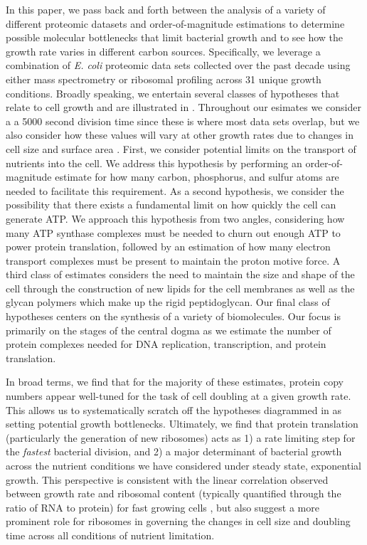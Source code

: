 In this paper, we pass back and forth between the analysis of a variety of
different proteomic datasets and order-of-magnitude estimations to determine
possible molecular bottlenecks that limit bacterial growth and to see how the
growth rate varies in different carbon sources. Specifically, we leverage a
combination of \textit{E. coli} proteomic data sets collected over the past
decade using either mass spectrometry \citep{schmidt2016,peebo2015,
valgepea2013} or ribosomal profiling \citep{li2014} across 31 unique growth
conditions. Broadly speaking, we entertain several classes of hypotheses that
relate to cell growth and are illustrated in .  Throughout our
esimates we consider a a 5000 second division time since these is where most
data sets overlap, but we also consider how these values will vary at other
growth rates due to changes in cell size and surface area
\citep{taheriaraghi2015}. First, we consider potential limits on the transport
of nutrients into the cell. We address this hypothesis by performing an
order-of-magnitude estimate for how many carbon, phosphorus, and sulfur atoms
are needed to facilitate this requirement. As a second hypothesis, we consider
the possibility that there exists a fundamental limit on how quickly the cell
can generate ATP. We approach this hypothesis from two angles, considering how
many ATP synthase complexes must be needed to churn out enough ATP to power
protein translation, followed by an estimation of how many electron transport
complexes must be present to maintain the proton motive force. A third class of
estimates considers the need to maintain the size and shape of the cell through
the construction of new lipids for the cell membranes as well as the glycan
polymers which make up the rigid peptidoglycan. Our final class of hypotheses
centers on the synthesis of a variety of biomolecules. Our focus is primarily on
the stages of the central dogma as we estimate the number of protein complexes
needed for DNA replication, transcription, and protein translation.

In broad terms, we find that for the majority of these estimates, protein copy numbers
appear well-tuned for the task of cell doubling at a given growth rate. This allows us to
systematically scratch off the hypotheses diagrammed in  as
setting potential growth bottlenecks. Ultimately, we find that protein
translation (particularly the generation of new ribosomes) acts as 1) a rate
limiting step for the \textit{fastest} bacterial division, and 2) a major
determinant of bacterial growth across the nutrient conditions we have
considered under steady state, exponential growth. This perspective is
consistent with the linear correlation observed between growth rate and
ribosomal content (typically quantified through the ratio of RNA to protein) for
fast growing cells \citep{bremer2008, scott2010}, but also suggest a more prominent role for
ribosomes in governing the changes in cell size and doubling time across all
conditions of nutrient limitation.

